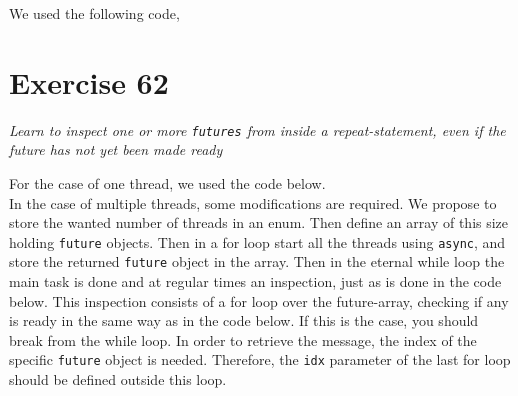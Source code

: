 \documentclass[12pt]{article}
\newcommand{\desc}[1]{\textit{#1} \vspace{1em}}
\begin{document}
We used the following code,



\clearpage

\section*{Exercise 62}
\desc{Learn to inspect one or more \texttt{futures} from inside a repeat-statement, even if the future has not yet been made ready}

For the case of one thread, we used the code below. \\
In the case of multiple threads, some modifications are required. We propose to store the wanted number of threads in an enum. Then define an array of this size holding \texttt{future} objects. Then in a for loop start all the threads using \texttt{async}, and store the returned \texttt{future} object in the array. Then in the eternal while loop the main task is done and at regular times an inspection, just as is done in the code below. This inspection consists of a for loop over the future-array, checking if any is ready in the same way as in the code below. If this is the case, you should break from the while loop. In order to retrieve the message, the index of the specific \texttt{future} object is needed. Therefore, the \texttt{idx} parameter of the last for loop should be defined outside this loop.   



\clearpage
\end{document}
